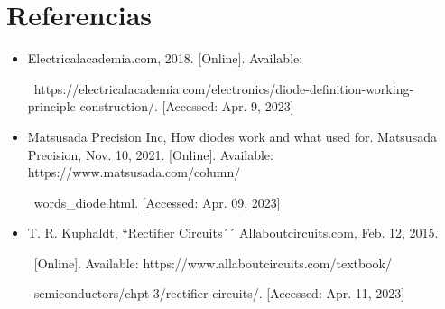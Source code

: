 \documentclass[12pt]{article}
\begin{document}
        \section*{Referencias}
        \label{sec:referencias}
        \begin{itemize}
            \item Electricalacademia.com, 2018. [Online]. Available:\par\ https://electricalacademia.com/electronics/diode-definition-working-principle-construction/. [Accessed: Apr. 9, 2023]
            \item Matsusada Precision Inc, How diodes work and what used for. Matsusada Precision, Nov. 10, 2021. [Online]. Available: https://www.matsusada.com/column/\par\ words\_diode.html. [Accessed: Apr. 09, 2023]
            \item T. R. Kuphaldt, ``Rectifier Circuits´´ Allaboutcircuits.com, Feb. 12, 2015. \par\ [Online]. Available: https://www.allaboutcircuits.com/textbook/\par\ semiconductors/chpt-3/rectifier-circuits/. [Accessed: Apr. 11, 2023]
        \end{itemize}
        
\end{document}
